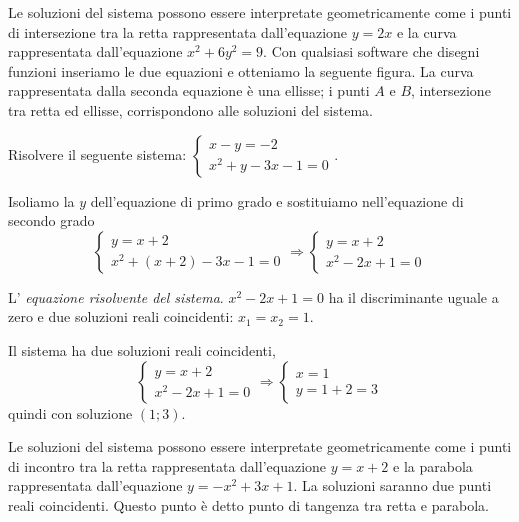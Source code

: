 \begin{esempio}{}{}
\begin{htmulticols}{2}
Le soluzioni del sistema possono essere interpretate geometricamente come 
i punti di intersezione tra la retta rappresentata dall'equazione \(y=2x\) 
e la curva rappresentata dall'equazione \(x^2+6y^2=9\). 
Con qualsiasi software che disegni funzioni inseriamo le due equazioni e 
otteniamo la seguente figura.
La curva rappresentata dalla seconda equazione è una ellisse; i punti 
\( A \) e \( B \), intersezione tra retta ed ellisse, corrispondono alle 
soluzioni del sistema.
\begin{center}

\end{center}
 \end{htmulticols}
\end{esempio}

\begin{esempio}{}{}
Risolvere il seguente sistema: \(\left\{\begin{array}{l}x-y=-2 \\x^2+y-3x-1=0\end{array}\right..\)

Isoliamo la \(y\) dell'equazione di primo grado e sostituiamo nell'equazione di secondo grado 
\[\left\{\begin{array}{l}y=x+2 \\
x^2+\left(x+2\right)-3x-1=0\end{array}\right. 
\Rightarrow\left\{\begin{array}{l}y=x+2 \\
x^2-2x+1=0\end{array}\right.\]

L' \emph{equazione risolvente del sistema}. \(x^2-2x+1=0\) ha il discriminante uguale a zero e due soluzioni reali coincidenti: \(x_1=x_2=1\).

Il sistema ha due soluzioni reali coincidenti, 
\[\left\{\begin{array}{l}y=x+2 \\x^2-2x+1=0\end{array}\right. 
\Rightarrow\left\{\begin{array}{l}x=1 \\
y=1+2=3\end{array}\right.\] 
quindi con soluzione \((1;3)\).
\begin{htmulticols}{2}
Le soluzioni del sistema possono essere interpretate geometricamente come i punti di incontro tra la retta rappresentata dall'equazione \(y=x+2\) e la parabola rappresentata dall'equazione \(y=-x^2+3x+1\). La soluzioni saranno due punti reali coincidenti. Questo punto è detto punto di tangenza tra retta e parabola.
\begin{center}

\end{center}
 \end{htmulticols}
\end{esempio}

